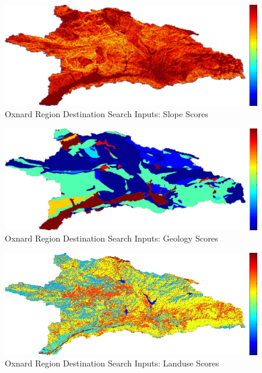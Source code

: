         \begin{figure}[!h]
            \begin{center}
            \includegraphics[width=5.5in]{figures/Oxnard_Search_Slope.png}   
            \caption{Oxnard Region Destination Search Inputs: Slope Scores}
            \label{fig:Odsinputs_slope}
            \end{center}
        \end{figure}
        
        \begin{figure}[!h]
            \begin{center}
            \includegraphics[width=5.5in]{figures/Oxnard_Search_Geology.png}   
            \caption{Oxnard Region Destination Search Inputs: Geology Scores}
            \label{fig:Odsinputs_geology}
            \end{center}
        \end{figure}
    
        \begin{figure}[!h]
            \begin{center}
            \includegraphics[width=5.5in]{figures/Oxnard_Search_Landuse.png}   
            \caption{Oxnard Region Destination Search Inputs: Landuse Scores}
            \label{fig:Odsinputs_landuse}
            \end{center}
        \end{figure}
    
